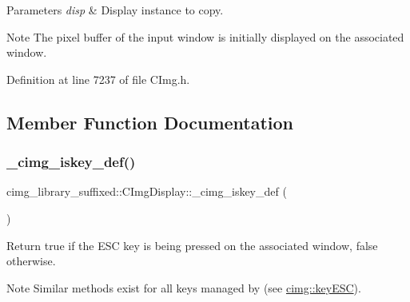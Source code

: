 \begin{DoxyParams}{Parameters}
{\em disp} & Display instance to copy. \\
\hline
\end{DoxyParams}
\begin{DoxyNote}{Note}
The pixel buffer of the input window is initially displayed on the associated window. 
\end{DoxyNote}


Definition at line 7237 of file C\+Img.\+h.



\subsection{Member Function Documentation}
\mbox{\label{structcimg__library__suffixed_1_1CImgDisplay_ab9275de6b6ba9ecdf03a5547d571fcc6}} 
\subsubsection{\texorpdfstring{\+\_\+cimg\+\_\+iskey\+\_\+def()}{\_cimg\_iskey\_def()}}
{\footnotesize\ttfamily cimg\+\_\+library\+\_\+suffixed\+::\+C\+Img\+Display\+::\+\_\+cimg\+\_\+iskey\+\_\+def (\begin{DoxyParamCaption}\item[{E\+SC}]{ }\end{DoxyParamCaption})}



Return {\ttfamily true} if the {\ttfamily E\+SC} key is being pressed on the associated window, {\ttfamily false} otherwise. 

\begin{DoxyNote}{Note}
Similar methods exist for all keys managed by  (see \hyperlink{namespacecimg__library__suffixed_1_1cimg_abaabb7beac6bae90502bd8378f7037f9}{cimg\+::key\+E\+SC}). 
\end{DoxyNote}
\mbox{\label{structcimg__library__suffixed_1_1CImgDisplay_a93447fdffa6c250ebc03e62e9279d603}} 
